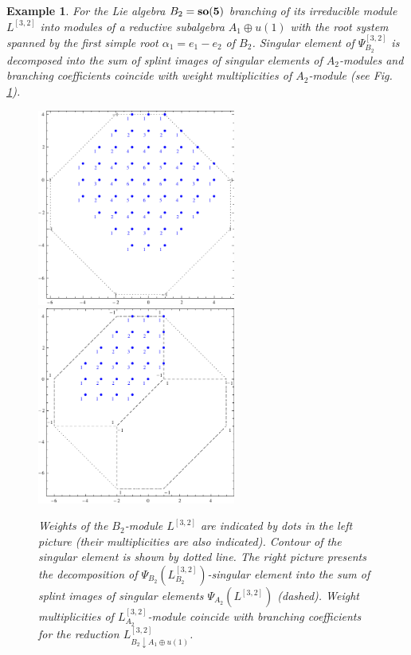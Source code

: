 \documentclass[12pt]{article}
\newtheorem{example}{Example}[section]
\begin{document}
\begin{example}
  For the Lie algebra $B_{2}= \bf{so}(5)$ branching of its irreducible module $L^{[3,2]}$ into  modules of a reductive subalgebra $A_{1}\oplus u(1)$ with the root system spanned by the first simple root $\alpha_1=e_1-e_2$ of $B_{2}$. Singular element of $\Psi^{[3,2]}_{B_{2}}$ is decomposed into the sum of splint images of singular elements of $A_{2}$-modules and branching coefficients coincide with weight multiplicities of $A_{2}$-module (see Fig. \ref{fig:b2_splint}).

  \begin{figure}[h!bt]
  \hspace*{-1.2cm}

   \includegraphics[width=65mm]{b2}
   \includegraphics[width=65mm]{b2-a2-a1}
  \caption{Weights of the $B_{2}$-module $L^{[3,2]}$ are indicated by dots in the left picture (their multiplicities are also indicated). Contour of the singular element is shown by dotted line. The right picture presents the decomposition of  $\Psi_{B_{2}}(L^{[3,2]}_{B_{2}})$-singular element into the sum of splint images of singular elements $\Psi_{A_{2}}(L^{[3,2]})$ (dashed). Weight multiplicities of $L^{[3,2]}_{A_{2}}$-module coincide with branching coefficients for the reduction $L^{[3,2]}_{B_{2}\downarrow A_{1}\oplus u(1)}$.}

 \label{fig:b2_splint}
\end{figure}
\end{example}
\end{document}
